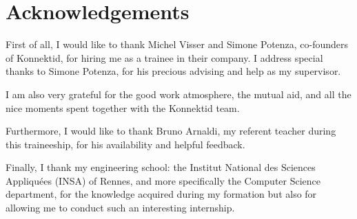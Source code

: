 \section{Acknowledgements}
\label{sec:thanks}

First of all, I would like to thank Michel {\sc Visser} and Simone {\sc Potenza}, co-founders of Konnektid, for hiring me as a trainee in their company.
I address special thanks to Simone {\sc Potenza}, for his precious advising and help as my supervisor.

I am also very grateful for the good work atmosphere, the mutual aid, and all the nice moments spent together with the Konnektid team.

Furthermore, I would like to thank Bruno {\sc Arnaldi}, my referent teacher during this traineeship, for his availability and helpful feedback.

Finally, I thank my engineering school: the \guillemotleft{} Institut National des Sciences Appliquées \guillemotright{} (INSA) of Rennes,
and more specifically the Computer Science department, for the knowledge acquired during my formation but also for allowing me to conduct such an interesting internship.
